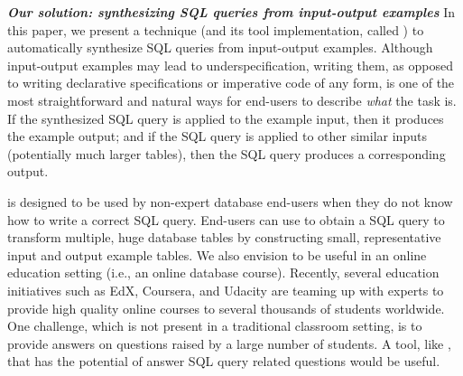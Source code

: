 

\vspace{1mm}
\noindent \textbf{\textit{Our solution: synthesizing SQL queries from input-output examples}}
In this paper, we present a technique (and its tool
implementation, called \ourtool) to automatically synthesize SQL queries
from input-output examples.
Although input-output examples may lead to
underspecification, writing them, as opposed to writing
declarative specifications or imperative code
of any form, is one of the most straightforward and natural ways
for end-users to describe \textit{what} the task is.
If the synthesized SQL query is applied
to the example input, then it produces the example output; and if the
SQL query is applied to other similar inputs (potentially much larger tables),
then the SQL query produces a corresponding output.




\ourtool is designed to be used by non-expert database
end-users when they do not know how
to write a correct SQL query. 
End-users can use \ourtool to obtain a SQL query to transform
multiple, huge database tables by constructing small, representative
input and output example tables. 
We also envision \ourtool to be useful in an online education
setting (i.e., an online database course). Recently, several
education initiatives such as EdX, Coursera,
and Udacity are teaming up with experts to provide
high quality online courses
to several thousands of students worldwide.
One challenge, which is not present in a traditional classroom
setting, is to provide answers on questions raised by a large
number of students. A tool, like \ourtool,
that has the potential of answer SQL query related questions
would be useful.


